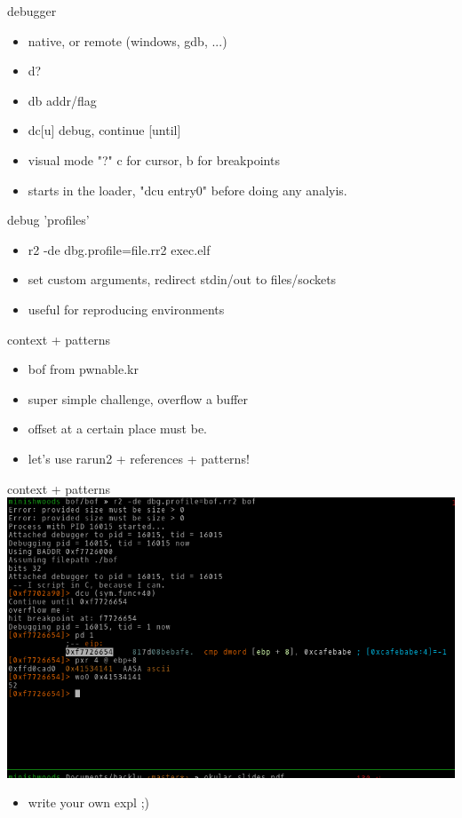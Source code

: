 \documentclass[10pt,pdf,utf8,english,compress,hyperref={unicode}]{beamer}
\begin{document}
\begin{frame}{debugger}
	\begin{itemize}
		\item native, or remote (windows, gdb, ...)
		\item d?
		\item db addr/flag
		\item dc[u] debug, continue [until]
		\item visual mode "?" c for cursor, b for breakpoints
		\item starts in the loader, "dcu entry0" before doing any analyis.
	\end{itemize}
\end{frame}

\begin{frame}{debug 'profiles'}
	\begin{itemize}
		\item r2 -de dbg.profile=file.rr2 exec.elf
		\item set custom arguments, redirect stdin/out to files/sockets
		\item useful for reproducing environments
	\end{itemize}
\end{frame}

\begin{frame}{context + patterns}
	\begin{itemize}
		\item bof from pwnable.kr 
		\item super simple challenge, overflow a buffer
		\item offset at a certain place must be.
		\item let's use rarun2 + references + patterns!
	\end{itemize}
\end{frame}

\begin{frame}{context + patterns}
	\includegraphics[width=\textwidth]{crimages/bof1.png}
	\begin{itemize}
		\item write your own expl ;)
	\end{itemize}
\end{frame}
\end{document}
